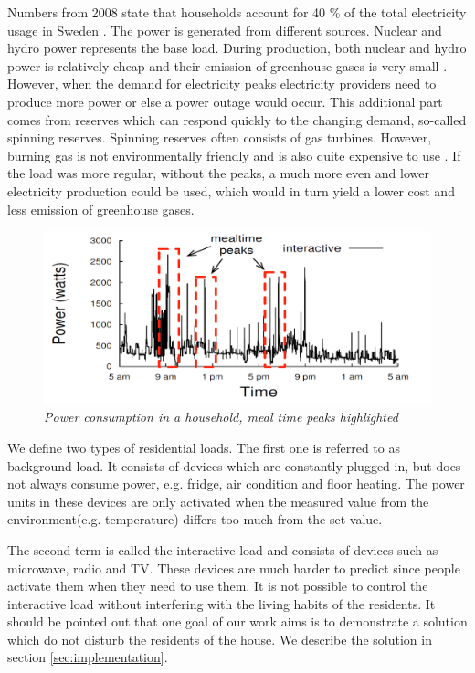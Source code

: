 Numbers from 2008 state that households account for 40 \% of the total electricity usage in Sweden \cite{WNA}. The power is generated from different sources. Nuclear and hydro power represents the base load. During production, both nuclear and hydro power is relatively cheap and their emission of greenhouse gases is very small \cite{WNA}. However, when the demand for electricity peaks electricity providers need to produce more power or else a power outage would occur. This additional part comes from reserves which can respond quickly to the changing demand, so-called spinning reserves. Spinning reserves often consists of gas turbines. However, burning gas is not environmentally friendly and is also quite expensive to use \cite{svenskenergi}. If the load was more regular, without the peaks, a much more even and lower electricity production could be used, which would in turn yield a lower cost and less emission of greenhouse gases.

\begin{figure}[!h]
\centering
\includegraphics[width=1.0\textwidth]{img/peakdemand.png}
\caption[Peaks]{\emph{\small Power consumption in a household, meal time peaks highlighted \cite{barker2012smartcap}}}
\label{peakconsumption}
\end{figure}
 
We define two types of residential loads. The first one is referred to as background load. It consists of devices which are constantly plugged in, but does not always consume power, e.g. fridge, air condition and floor heating. The power units in these devices are only activated when the measured value from the environment(e.g. temperature) differs too much from the set value.

The second term is called the interactive load and consists of devices such as microwave, radio and TV. These devices are much harder to predict since people activate them when they need to use them. It is not possible to control the interactive load without interfering with the living habits of the residents. It should be pointed out that one goal of our work aims is to demonstrate a solution which do not disturb the residents of the house. We describe the solution in section \ref{sec:implementation}.

